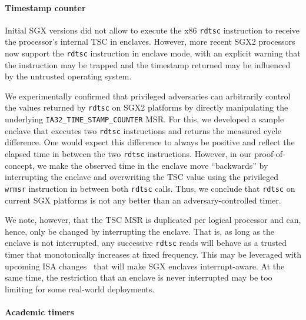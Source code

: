 \documentclass[sigplan,10pt]{acmart}
\newcommand{\inst}[1]{\texttt{\lowercase{#1}}}
\begin{document}


\paragraph{Timestamp counter}
Initial SGX versions did not allow to execute the x86 \inst{RDTSC} instruction
to receive the processor's internal \ac{TSC} in enclaves. However, more recent
SGX2 processors now support the \inst{RDTSC} instruction in enclave mode,
with an explicit warning that the instruction may be trapped and the
timestamp returned may be influenced by the untrusted operating system.


We experimentally confirmed that privileged adversaries can arbitrarily control
the values returned by \inst{rdtsc} on SGX2 platforms by directly manipulating
the underlying \texttt{IA32\_TIME\_STAMP\_COUNTER} \ac{MSR}. For this, we
developed a sample enclave that executes two \texttt{rdtsc} instructions and
returns the measured cycle difference. One would expect this difference to
always be positive and reflect the elapsed time in between the two \inst{rdtsc}
instructions. However, in our proof-of-concept, we make the observed time in the
enclave move ``backwards'' by interrupting the enclave and overwriting the
\ac{TSC} value using the privileged \inst{wrmsr} instruction in between both
\inst{rdtsc} calls. Thus, we conclude that \inst{rdtsc} on current SGX platforms
is not any better than an adversary-controlled \Tzero{} timer.

We note, however, that the \ac{TSC} \ac{MSR} is duplicated per logical processor
and can, hence, only be changed by interrupting the enclave. That is, as long as
the enclave is not interrupted, any successive \inst{rdtsc} reads will behave as
a trusted \Tfour{} timer that monotonically increases at fixed frequency. This
may be leveraged with upcoming ISA changes~\cite{intel2022aexnotify} that will
make SGX enclaves interrupt-aware. 
At the same time, the restriction that an enclave is never interrupted may be
too limiting for some real-world deployments.

\paragraph{Academic timers}
\end{document}
